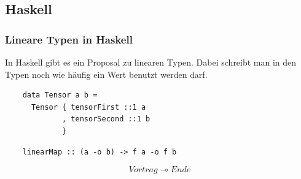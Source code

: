 \documentclass{beamer}
\begin{document}
\subsection{Haskell}
\begin{frame}[fragile]
  \frametitle{Lineare Typen in Haskell}
  In Haskell gibt es ein Proposal zu linearen Typen. Dabei schreibt man in den Typen noch wie häufig ein Wert benutzt werden darf.

  \begin{lstlisting}
    data Tensor a b =
      Tensor { tensorFirst ::1 a
             , tensorSecond ::1 b
             }
  \end{lstlisting}

  \begin{lstlisting}
    linearMap :: (a -o b) -> f a -o f b
  \end{lstlisting}
\end{frame}

\begin{frame}
  \begin{equation*}
    Vortrag \multimap Ende
  \end{equation*}
\end{frame}
\end{document}
